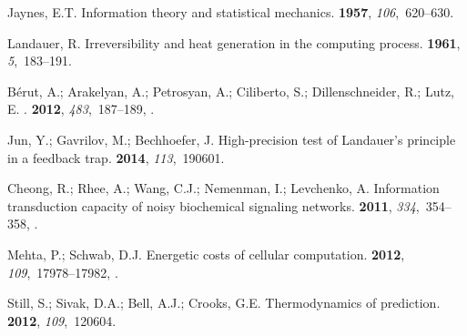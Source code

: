 \documentclass[entropy,article,
submit,
moreauthors,pdftex,10pt,a4paper]{mdpi}
\begin{document}


%
\begin{thebibliography}{-------}
\providecommand{\natexlab}[1]{#1}

Jaynes, E.T.
\newblock Information theory and statistical mechanics.
 {\bf 1957}, {\em 106},~620--630.

Landauer, R.
\newblock Irreversibility and heat generation in the computing process.
 {\bf 1961}, {\em
  5},~183--191.

B{\'{e}}rut, A.; Arakelyan, A.; Petrosyan, A.; Ciliberto, S.; Dillenschneider,
  R.; Lutz, E.
.
 {\bf 2012}, {\em 483},~187--189,
  \href{http://xxx.lanl.gov/abs/arXiv:1503.06537v1}{{\normalfont
  [arXiv:1503.06537v1]}}.

Jun, Y.; Gavrilov, M.; Bechhoefer, J.
\newblock High-precision test of Landauer's principle in a feedback trap.
 {\bf 2014}, {\em 113},~190601.

Cheong, R.; Rhee, A.; Wang, C.J.; Nemenman, I.; Levchenko, A.
\newblock Information transduction capacity of noisy biochemical signaling
  networks.
 {\bf 2011}, {\em 334},~354--358,
  \href{http://xxx.lanl.gov/abs/http://science.sciencemag.org/content/334/6054/354.full.pdf}{{}}.

Mehta, P.; Schwab, D.J.
\newblock Energetic costs of cellular computation.
 {\bf 2012},
  {\em 109},~17978--17982,
  \href{http://xxx.lanl.gov/abs/http://www.pnas.org/content/109/44/17978.full.pdf}{{}}.

Still, S.; Sivak, D.A.; Bell, A.J.; Crooks, G.E.
\newblock Thermodynamics of prediction.
 {\bf 2012}, {\em 109},~120604.


\end{thebibliography}
\end{document}
